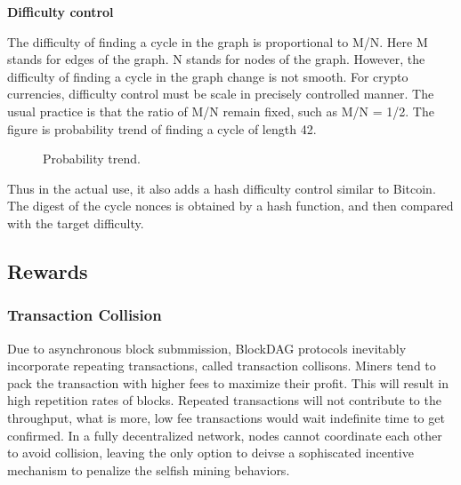 \documentclass[a4paper,11pt]{article}
\begin{document}
\textbf{Difficulty control}

The difficulty of finding a cycle in the graph is proportional to M/N. Here M stands for edges of the graph.
N stands for nodes of the graph. However, the difficulty of finding a cycle in the graph change is not smooth.
For crypto currencies, difficulty control must be scale in precisely controlled manner. The usual practice is
that the ratio of M/N remain fixed, such as M/N = 1/2.
The figure is probability trend of finding a cycle of length 42.

\begin{figure}[ht]
	\centerline{%
	}
	\caption{Probability trend.}
\end{figure}

Thus in the actual use, it also adds a hash difficulty control similar to Bitcoin. The digest of the cycle nonces is obtained by a hash function,
and then compared with the target difficulty.

\subsection{Rewards}
\subsubsection{Transaction Collision}
Due to asynchronous block submmission, BlockDAG protocols inevitably incorporate repeating transactions, called transaction collisons. 
Miners tend to pack the transaction with higher fees to maximize their profit. This will result in high repetition rates of blocks. Repeated transactions will not contribute to the throughput, what is more, low fee transactions would wait indefinite time to get confirmed. In a fully decentralized network, nodes cannot coordinate each other to avoid collision, leaving the only option to deivse a sophiscated incentive mechanism to penalize the selfish mining behaviors. 
\end{document}
